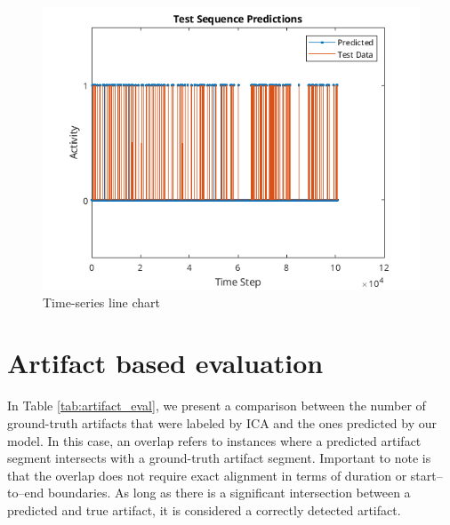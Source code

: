 \documentclass[12pt,a4paper,titlepage,openany]{report}
\begin{document}
\begin{figure}[H]
    \includegraphics[width=1\linewidth]{./new_training/test_sequence_predictions_new.png}
    \caption{Time-series line chart}
    \label{fig:time-series}
\end{figure}

\section{Artifact based evaluation}

In Table \ref{tab:artifact_eval}, we present a comparison between the number of ground-truth artifacts that were labeled by ICA and the ones predicted by our model. In this case, an overlap refers to instances where a predicted artifact segment intersects with a ground-truth artifact segment. Important to note is that the overlap does not require exact alignment in terms of duration or start–to–end boundaries. As long as there is a significant intersection between a predicted and true artifact, it is considered a correctly detected artifact.
\end{document}
